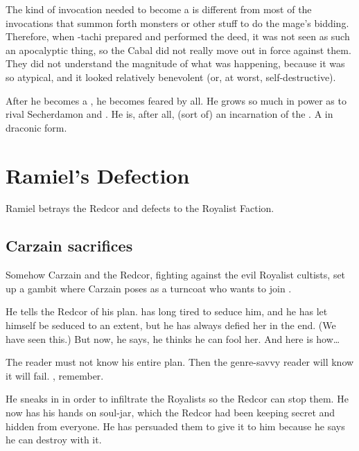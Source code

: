 The kind of invocation needed to become a \shaeeroth{} is different from most of the invocations that summon forth monsters or other stuff to do the mage's bidding. 
Therefore, when \Vizsherioch-tachi prepared and performed the deed, it was not seen as such an apocalyptic thing, so the Cabal did not really move out in force against them. 
They did not understand the magnitude of what was happening, because it was so atypical, and it looked relatively benevolent (or, at worst, self-destructive). 

After he becomes a \shaeeroth, he becomes feared by all.
He grows so much in power as to rival Secherdamon and \Ishnaruchaefir. 
He is, after all, (sort of) an incarnation of the \xs. A \xs in draconic form.















\section{Ramiel's Defection}
Ramiel betrays the Redcor and defects to the Royalist Faction. 







\subsection{Carzain sacrifices \Racel} 
Somehow Carzain and the Redcor, fighting against the evil Royalist cultists, set up a gambit where Carzain poses as a turncoat who wants to join \Belzir. 

He tells the Redcor of his plan. 
\Belzir{} has long tired to seduce him, and he has let himself be seduced to an extent, but he has always defied her in the end. 
(We have seen this.) 
But now, he says, he thinks he can fool her. 
And here is how\ldots{} 

The reader must not know his entire plan. 
Then the genre-savvy reader will know it will fail. 
, remember. 

He sneaks in in order to infiltrate the Royalists so the Redcor can stop them. 
He now has his hands on  soul-jar, which the Redcor had been keeping secret and hidden from everyone. 
He has persuaded them to give it to him because he says he can destroy \Belzir{} with it. 

